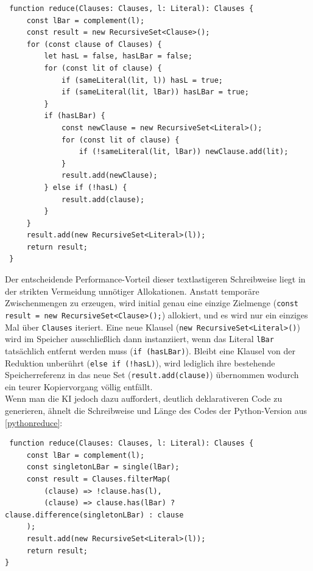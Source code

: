 \begin{verbatim}
 function reduce(Clauses: Clauses, l: Literal): Clauses {
     const lBar = complement(l);
     const result = new RecursiveSet<Clause>();
     for (const clause of Clauses) {
         let hasL = false, hasLBar = false;
         for (const lit of clause) {
             if (sameLiteral(lit, l)) hasL = true;
             if (sameLiteral(lit, lBar)) hasLBar = true;
         }
         if (hasLBar) {
             const newClause = new RecursiveSet<Literal>();
             for (const lit of clause) {
                 if (!sameLiteral(lit, lBar)) newClause.add(lit);
			 }
             result.add(newClause);
         } else if (!hasL) {
             result.add(clause);
         }
     }
     result.add(new RecursiveSet<Literal>(l));
     return result;
 }
\end{verbatim}
\caption{Reduktionsschritt in TypeScript mit \texttt{RecursiveSet}}

Der entscheidende Performance-Vorteil dieser textlastigeren Schreibweise liegt in der strikten Vermeidung unnötiger Allokationen. Anstatt temporäre Zwischenmengen zu erzeugen, wird initial genau eine einzige Zielmenge (\texttt{const result = new RecursiveSet<Clause>();}) allokiert, und es wird nur ein einziges Mal über \texttt{Clauses} iteriert. 
Eine neue Klausel (\texttt{new RecursiveSet<Literal>()}) wird im Speicher ausschließlich dann instanziiert, wenn das Literal \texttt{lBar} tatsächlich entfernt werden muss (\texttt{if (hasLBar)}). Bleibt eine Klausel von der Reduktion unberührt (\texttt{else if (!hasL)}), wird lediglich ihre bestehende Speicherreferenz in das neue Set (\texttt{result.add(clause)}) übernommen wodurch ein teurer Kopiervorgang völlig entfällt.\\ 

Wenn man die KI jedoch dazu auffordert, deutlich deklarativeren Code zu generieren, ähnelt die Schreibweise und Länge des Codes der Python-Version aus \ref{pythonreduce}:

\begin{verbatim}
 function reduce(Clauses: Clauses, l: Literal): Clauses {
     const lBar = complement(l);
     const singletonLBar = single(lBar);
     const result = Clauses.filterMap(
         (clause) => !clause.has(l),
         (clause) => clause.has(lBar) ? clause.difference(singletonLBar) : clause
     );
     result.add(new RecursiveSet<Literal>(l));
     return result;
}
\end{verbatim}
\caption{Reduktionsschritt in TypeScript mit \texttt{RecursiveSet}}


